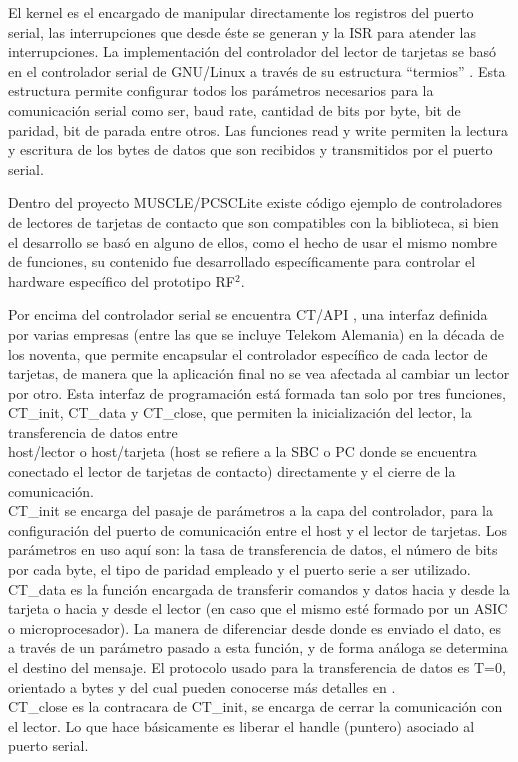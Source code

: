 \bigskip
{}
El kernel es el encargado de manipular directamente los registros del puerto serial, las interrupciones que desde éste se generan y la ISR para atender las interrupciones.
La implementación del controlador del lector de tarjetas se basó en el controlador serial de GNU/Linux a través de su estructura “termios” \cite{termios}. Esta estructura permite configurar todos los parámetros necesarios para la comunicación serial como ser, baud rate, cantidad de bits por byte, bit de paridad, bit de parada entre otros. Las funciones read y write permiten la lectura y escritura de los bytes de datos que son recibidos y transmitidos por el puerto serial.

Dentro del proyecto MUSCLE/PCSCLite existe código ejemplo de controladores de lectores de tarjetas de contacto que son compatibles con la biblioteca, si bien el desarrollo se basó en alguno de ellos, como el hecho de usar el mismo nombre de funciones, su contenido fue desarrollado específicamente para controlar el hardware específico del prototipo RF$^{2}$.

\bigskip
{}
Por encima del controlador serial se encuentra CT/API \cite{ctapi}, una interfaz definida por varias empresas (entre las que se incluye Telekom Alemania) en la década de los noventa, que permite encapsular el controlador específico de cada lector de tarjetas, de manera que la aplicación final no se vea afectada al cambiar un lector por otro.
Esta interfaz de programación está formada tan solo por tres funciones, CT\_init, CT\_data y CT\_close, que permiten la inicialización del lector, la transferencia de datos entre \\
host/lector o host/tarjeta (host se refiere a la SBC o PC donde se encuentra conectado el lector de tarjetas de contacto) directamente y el cierre de la comunicación.\\
CT\_init se encarga del pasaje de parámetros a la capa del controlador, para la configuración del puerto de comunicación entre el host y el lector de tarjetas. Los parámetros en uso aquí son: la tasa de transferencia de datos, el número de bits por cada byte, el tipo de paridad empleado y el puerto serie a ser utilizado.\\
CT\_data es la función encargada de transferir comandos y datos hacia y desde la tarjeta o hacia y desde el lector (en caso que el mismo esté formado por un ASIC o microprocesador). La manera de diferenciar desde donde es enviado el dato, es a través de un parámetro pasado a esta función, y de forma análoga se determina el destino del mensaje. El protocolo usado para la transferencia de datos es T=0, orientado a bytes y del cual pueden conocerse más detalles en \cite{SCHb}.\\
CT\_close es la contracara de  CT\_init, se encarga de cerrar la comunicación con el lector. Lo que hace básicamente es liberar el handle (puntero) asociado al puerto serial.

